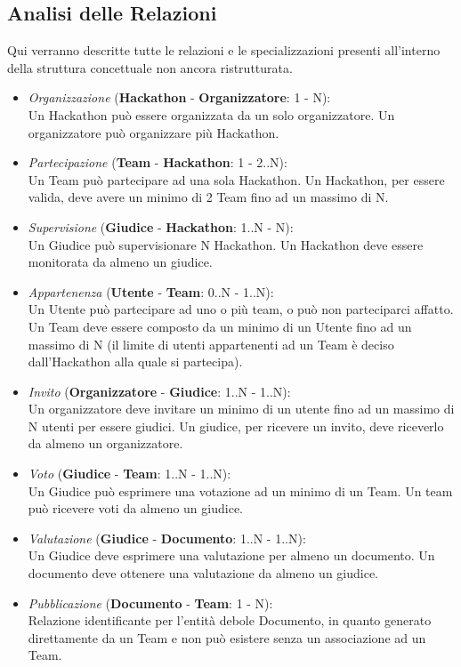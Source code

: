 \documentclass[a4paper, 10pt]{article}
\begin{document}
	\subsection{Analisi delle Relazioni}
	Qui verranno descritte tutte le relazioni e le specializzazioni presenti all'interno della struttura concettuale non ancora ristrutturata.
	\begin{itemize}
		\item \textit{Organizzazione} (\textbf{Hackathon} - \textbf{Organizzatore}: 1 - N):\\Un Hackathon può essere organizzata da un solo organizzatore. Un organizzatore può organizzare più Hackathon.
		\item \textit{Partecipazione} (\textbf{Team} - \textbf{Hackathon}: 1 - 2..N):\\Un Team può partecipare ad una sola Hackathon. Un Hackathon, per essere valida, deve avere un minimo di 2 Team fino ad un massimo di N.
		\item \textit{Supervisione} (\textbf{Giudice} - \textbf{Hackathon}: 1..N - N):\\Un Giudice può supervisionare N Hackathon. Un Hackathon deve essere monitorata da almeno un giudice.
		\item \textit{Appartenenza} (\textbf{Utente} - \textbf{Team}: 0..N - 1..N):\\Un Utente può partecipare ad uno o più team, o può non parteciparci affatto. Un Team deve essere composto da un minimo di un Utente fino ad un massimo di N (il limite di utenti appartenenti ad un Team è deciso dall'Hackathon alla quale si partecipa).
		\item \textit{Invito} (\textbf{Organizzatore} - \textbf{Giudice}: 1..N - 1..N):\\Un organizzatore deve invitare un minimo di un utente fino ad un massimo di N utenti per essere giudici. Un giudice, per ricevere un invito, deve riceverlo da almeno un organizzatore.
		\item \textit{Voto} (\textbf{Giudice} - \textbf{Team}: 1..N - 1..N):\\Un Giudice può esprimere una votazione ad un minimo di un Team. Un team può ricevere voti da almeno un giudice.
		\item \textit{Valutazione} (\textbf{Giudice} - \textbf{Documento}: 1..N - 1..N):\\Un Giudice deve esprimere una valutazione per almeno un documento. Un documento deve ottenere una valutazione da almeno un giudice.
		\item \textit{Pubblicazione} (\textbf{Documento} - \textbf{Team}: 1 - N):\\Relazione identificante per l'entità debole Documento, in quanto generato direttamente da un Team e non può esistere senza un associazione ad un Team.
	\end{itemize}
\end{document}
